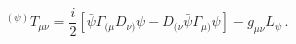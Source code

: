 \begin{equation}\label{eq:emt}
  {}^{(\psi)} T_{\mu\nu}=\frac{i}{2}\left[\bar{\psi}\Gamma_{(\mu}
    D_{\nu)} \psi-D_{(\nu} \bar{\psi} \Gamma_{\mu)} \psi\right]
  - g_{\mu\nu}L_\psi \, .
\end{equation}

